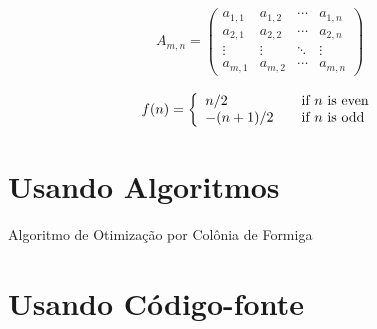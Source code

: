 \lipsum[5]

	\begin{equation}
		\begin{aligned}
			A_{m,n} =
			\begin{pmatrix}
			a_{1,1} & a_{1,2} & \cdots & a_{1,n} \\
			a_{2,1} & a_{2,2} & \cdots & a_{2,n} \\
			\vdots  & \vdots  & \ddots & \vdots  \\
			a_{m,1} & a_{m,2} & \cdots & a_{m,n}
			\end{pmatrix}
		\end{aligned}
	\end{equation}

\lipsum[6]

	\begin{equation}
		\begin{aligned}
			f(n) = \left\{ 
			\begin{array}{l l}
			n/2 & \quad \text{if $n$ is even}\\
			-(n+1)/2 & \quad \text{if $n$ is odd}
			\end{array} \right.
		\end{aligned}
	\end{equation}
	
\lipsum[7]

\section{Usando Algoritmos}

\lipsum[8]

\begin{algorithm}[h!]
	\SetSpacedAlgorithm
	\caption{\label{alg:algoritmo_de_colonica_de_formigas}Algoritmo de Otimização por Colônia de Formiga}
\end{algorithm}

\lipsum[9]

\section{Usando Código-fonte}

\lipsum[10]



